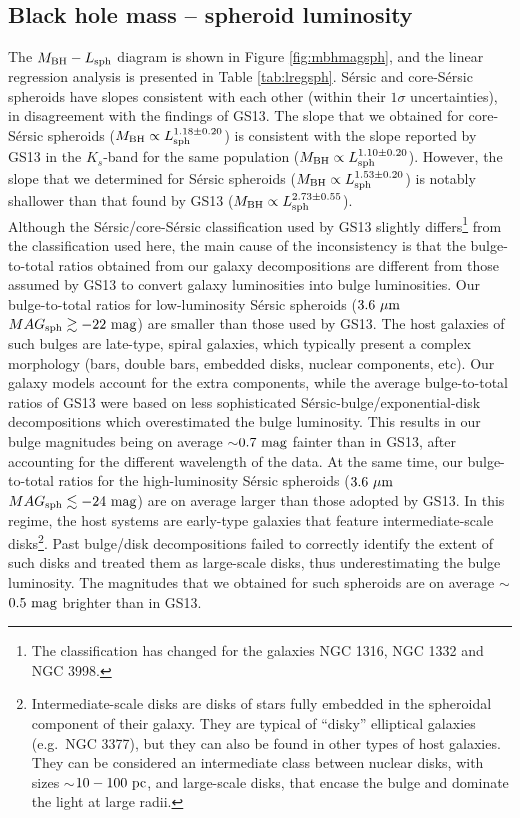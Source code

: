 \documentclass[preprint2]{emulateapj}
\begin{document}
\subsection{Black hole mass -- spheroid luminosity}
The $M_{\rm BH} - L_{\rm sph}$ diagram is shown in Figure \ref{fig:mbhmagsph}, 
and the linear regression analysis is presented in Table \ref{tab:lregsph}. 
S\'ersic and core-S\'ersic spheroids have slopes consistent with each other (within their $1\sigma$ uncertainties), 
in disagreement with the findings of GS13. 
The slope that we obtained for core-S\'ersic spheroids ($M_{\rm BH} \propto L_{\rm sph}^{1.18 \pm 0.20}$) 
is consistent with the slope reported by GS13 in the $K_s$-band for the same population ($M_{\rm BH} \propto L_{\rm sph}^{1.10 \pm 0.20}$). 
However, the slope that we determined for S\'ersic spheroids ($M_{\rm BH} \propto L_{\rm sph}^{1.53 \pm 0.20}$) 
is notably shallower than that found by GS13 ($M_{\rm BH} \propto L_{\rm sph}^{2.73 \pm 0.55}$). \\
Although the S\'ersic/core-S\'ersic classification used by GS13 slightly differs\footnote{The classification has changed for the galaxies 
NGC 1316, NGC 1332 and NGC 3998.} from the classification used here, 
the main cause of the inconsistency is that the bulge-to-total ratios obtained from our galaxy decompositions 
are different from those assumed by GS13 to convert galaxy luminosities into bulge luminosities.
Our bulge-to-total ratios for low-luminosity S\'ersic spheroids ($3.6\rm~\mu m$ $MAG_{\rm sph} \gtrsim -22 \rm~mag$) 
are smaller than those used by GS13. 
The host galaxies of such bulges are late-type, spiral galaxies, 
which typically present a complex morphology (bars, double bars, embedded disks, nuclear components, etc).
Our galaxy models account for the extra components, 
while the average bulge-to-total ratios of GS13 were based on less sophisticated S\'ersic-bulge/exponential-disk decompositions 
which overestimated the bulge luminosity.
This results in our bulge magnitudes being on average $\sim$$0.7\rm~mag$ fainter than in GS13, after accounting for the different wavelength of the data.
At the same time, our bulge-to-total ratios for the high-luminosity S\'ersic spheroids ($3.6\rm~\mu m$ $MAG_{\rm sph} \lesssim -24 \rm~mag$) 
are on average larger than those adopted by GS13.
In this regime, the host systems are early-type galaxies that feature intermediate-scale disks\footnote{Intermediate-scale disks are 
disks of stars fully embedded in the spheroidal component of their galaxy. 
They are typical of ``disky'' elliptical galaxies (e.g.~NGC 3377), 
but they can also be found in other types of host galaxies.
They can be considered an intermediate class between nuclear disks, with sizes $\sim$$10-100\rm~pc$, %
and large-scale disks, that encase the bulge and dominate the light at large radii.}. 
Past bulge/disk decompositions failed to correctly identify the extent of such disks and treated them as large-scale disks, 
thus underestimating the bulge luminosity.
The magnitudes that we obtained for such spheroids are on average $\sim$$0.5\rm~mag$ brighter than in GS13. 
\end{document}
